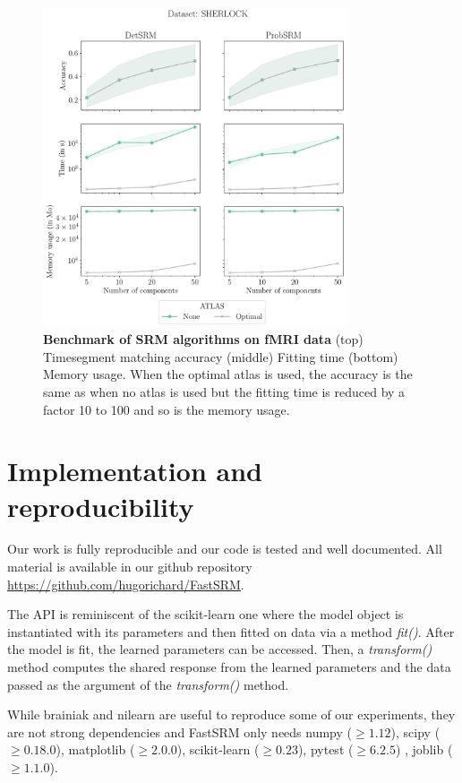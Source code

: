 \documentclass{article}
\begin{document}
\begin{figure}
  \centering
  \includegraphics[width=0.8\textwidth]{../figures/timesegment_matching_sherlock.pdf}
  \caption{\textbf{Benchmark of SRM algorithms on fMRI data} (top) Timesegment
    matching accuracy (middle) Fitting time (bottom) Memory usage. When the
    optimal atlas is used, the accuracy is the same as when no atlas is used but
    the fitting time is reduced by a factor 10 to 100 and so is the memory usage.
  }
  \label{fig:srm:timesegment}
\end{figure}

\section{Implementation and reproducibility}
Our work is fully reproducible and our code is tested and well documented. All
material is available in our github repository \url{https://github.com/hugorichard/FastSRM}.

The API is reminiscent of the scikit-learn one where the model object is
instantiated with its parameters and then fitted on data via a method
\emph{fit()}. After the model is fit, the learned parameters can be accessed.
Then, a \emph{transform()} method computes the shared
response from the learned parameters and the data passed as the argument of the \emph{transform()} method.

While brainiak and nilearn are useful to reproduce some of our experiments, they
are not strong dependencies and FastSRM only needs numpy ($\geq 1.12$), scipy
($\geq 0.18.0$), matplotlib ($\geq 2.0.0$), scikit-learn ($\geq 0.23$), pytest
($\geq 6.2.5$) , joblib ($\geq 1.1.0$).
\end{document}
